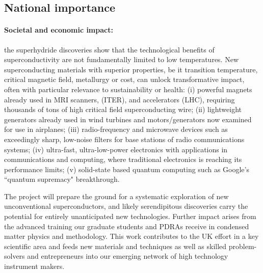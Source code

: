 

\subsection*{National importance}
\paragraph{Societal and economic impact:}
the superhydride discoveries show that the technological benefits of superconductivity are not fundamentally limited to low temperatures. 
New superconducting materials with superior properties, be it transition temperature,
critical magnetic field, metallurgy or cost, 
can unlock transformative impact, often with particular relevance to sustainability or health: 
(i) powerful magnets already used in MRI scanners, %
  (ITER), and accelerators (LHC), requiring  thousands of tons of high critical field superconducting wire; 
(ii) lightweight generators already used in wind turbines and motors/generators now examined for use in airplanes;   
(iii) radio-frequency and microwave devices such as exceedingly sharp, low-noise filters for base stations of radio communications systems; 
(iv) ultra-fast, ultra-low-power electronics with applications in communications and computing, where traditional electronics is reaching its performance limits; 
(v) solid-state based quantum computing such as Google's ``quantum supremacy" breakthrough.

The project will prepare the ground for a systematic exploration of new unconventional superconductors, and likely serendipitous discoveries carry the potential for entirely unanticipated new technologies. 
Further impact arises from the advanced training our graduate students and PDRAs receive in condensed matter physics and methodology. This
work contributes to the UK effort in a key scientific area and feeds new materials and techniques as well as skilled problem-solvers and
entrepreneurs into our emerging network of high technology instrument
makers.


